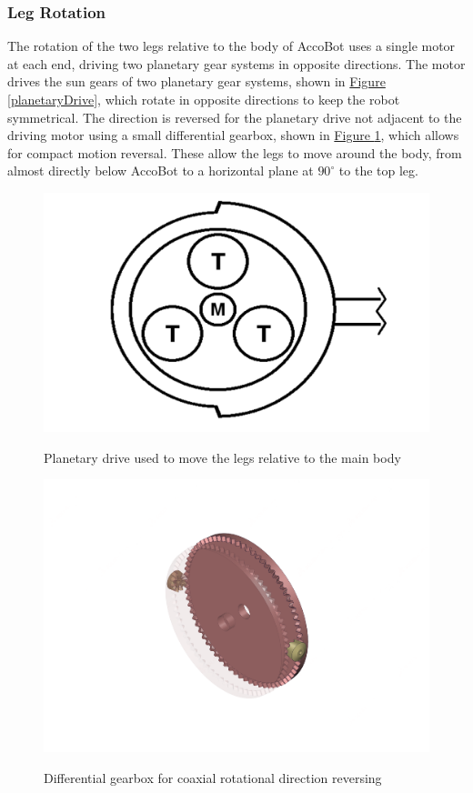 \documentclass[11pt]{article}		%
\newlength{\imageheight}	 %
\newcommand{\figref}[1]{\hyperref[#1]{Figure \ref*{#1}}}    %
\begin{document}
			\subsubsection{Leg Rotation}
				
				The rotation of the two legs relative to the body of AccoBot uses a single motor at each end, driving two planetary gear systems in opposite directions.
				The motor drives the sun gears of two planetary gear systems, shown in \figref{planetaryDrive}, which rotate in opposite directions to keep the robot symmetrical.
				The direction is reversed for the planetary drive not adjacent to the driving motor using a small differential gearbox, shown in \figref{diffGearbox}, which allows for compact motion reversal.
				These allow the legs to move around the body, from almost directly below AccoBot to a horizontal plane at $90^\circ$ to the top leg.
				
				\begin{figure}[h]
					\centering
					\begin{multicols}{2}
						\includegraphics[height=\imageheight]{planetaryDrive}
						\caption{Planetary drive used to move the legs relative to the main body}
						\label{planetaryDrive}
						\columnbreak
						\includegraphics[height=\imageheight]{diffGearbox}
						\caption{Differential gearbox for coaxial rotational direction reversing}
						\label{diffGearbox}
					\end{multicols}
				\end{figure}
				
\end{document}
